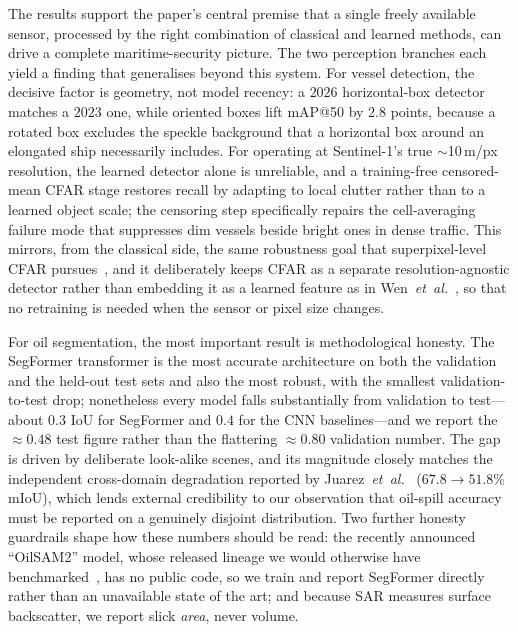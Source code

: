 \documentclass[a4paper,11pt]{article}
\begin{document}
The results support the paper's central premise that a single freely available sensor,
processed by the right combination of classical and learned methods, can drive a
complete maritime-security picture. The two perception branches each yield a finding that
generalises beyond this system. For vessel detection, the decisive factor is geometry,
not model recency: a $2026$ horizontal-box detector matches a $2023$ one, while oriented
boxes lift mAP@50 by $2.8$ points, because a rotated box excludes the speckle background
that a horizontal box around an elongated ship necessarily includes. For operating at
Sentinel-1's true $\sim$10\,m/px resolution, the learned detector alone is unreliable,
and a training-free censored-mean CFAR stage restores recall by adapting to local clutter
rather than to a learned object scale; the censoring step specifically repairs the
cell-averaging failure mode that suppresses dim vessels beside bright ones in dense
traffic. This mirrors, from the classical side, the same robustness goal that
superpixel-level CFAR pursues~\cite{zhang2023spcfar}, and it deliberately keeps CFAR as a
separate resolution-agnostic detector rather than embedding it as a learned feature as in
Wen~\textit{et~al.}~\cite{wen2024cfaryolo}, so that no retraining is needed when the
sensor or pixel size changes.

For oil segmentation, the most important result is methodological honesty. The SegFormer
transformer is the most accurate architecture on both the validation and the held-out
test sets and also the most robust, with the smallest validation-to-test drop; nonetheless
every model falls substantially from validation to test---about $0.3$ IoU for SegFormer
and $0.4$ for the CNN baselines---and we report the $\approx0.48$ test figure rather than
the flattering $\approx0.80$ validation number. The gap is driven by
deliberate look-alike scenes, and its magnitude closely matches the independent
cross-domain degradation reported by
Juarez~\textit{et~al.}~\cite{juarez2025crossdomain} ($67.8\!\rightarrow\!51.8\%$ mIoU),
which lends external credibility to our observation that oil-spill accuracy must be
reported on a genuinely disjoint distribution. Two further honesty guardrails shape how
these numbers should be read: the recently announced ``OilSAM2'' model, whose released
lineage we would otherwise have benchmarked~\cite{wu2024compositional}, has no public
code, so we train and report SegFormer directly rather than an unavailable state of the
art; and because SAR measures surface backscatter, we report slick \emph{area}, never volume.
\end{document}
